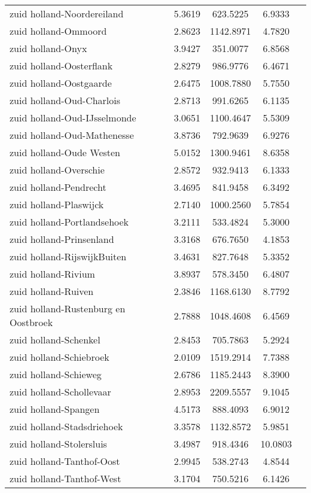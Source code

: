 \begin{longtable}{llccc}
zuid holland-Noordereiland & 5.3619 & 623.5225 & 6.9333 \\
zuid holland-Ommoord & 2.8623 & 1142.8971 & 4.7820 \\
zuid holland-Onyx & 3.9427 & 351.0077 & 6.8568 \\
zuid holland-Oosterflank & 2.8279 & 986.9776 & 6.4671 \\
zuid holland-Oostgaarde & 2.6475 & 1008.7880 & 5.7550 \\
zuid holland-Oud-Charlois & 2.8713 & 991.6265 & 6.1135 \\
zuid holland-Oud-IJsselmonde & 3.0651 & 1100.4647 & 5.5309 \\
zuid holland-Oud-Mathenesse & 3.8736 & 792.9639 & 6.9276 \\
zuid holland-Oude Westen & 5.0152 & 1300.9461 & 8.6358 \\
zuid holland-Overschie & 2.8572 & 932.9413 & 6.1333 \\
zuid holland-Pendrecht & 3.4695 & 841.9458 & 6.3492 \\
zuid holland-Plaswijck & 2.7140 & 1000.2560 & 5.7854 \\
zuid holland-Portlandsehoek & 3.2111 & 533.4824 & 5.3000 \\
zuid holland-Prinsenland & 3.3168 & 676.7650 & 4.1853 \\
zuid holland-RijswijkBuiten & 3.4631 & 827.7648 & 5.3352 \\
zuid holland-Rivium & 3.8937 & 578.3450 & 6.4807 \\
zuid holland-Ruiven & 2.3846 & 1168.6130 & 8.7792 \\
zuid holland-Rustenburg en Oostbroek & 2.7888 & 1048.4608 & 6.4569 \\
zuid holland-Schenkel & 2.8453 & 705.7863 & 5.2924 \\
zuid holland-Schiebroek & 2.0109 & 1519.2914 & 7.7388 \\
zuid holland-Schieweg & 2.6786 & 1185.2443 & 8.3900 \\
zuid holland-Schollevaar & 2.8953 & 2209.5557 & 9.1045 \\
zuid holland-Spangen & 4.5173 & 888.4093 & 6.9012 \\
zuid holland-Stadsdriehoek & 3.3578 & 1132.8572 & 5.9851 \\
zuid holland-Stolersluis & 3.4987 & 918.4346 & 10.0803 \\
zuid holland-Tanthof-Oost & 2.9945 & 538.2743 & 4.8544 \\
zuid holland-Tanthof-West & 3.1704 & 750.5216 & 6.1426 \\

\end{longtable}
